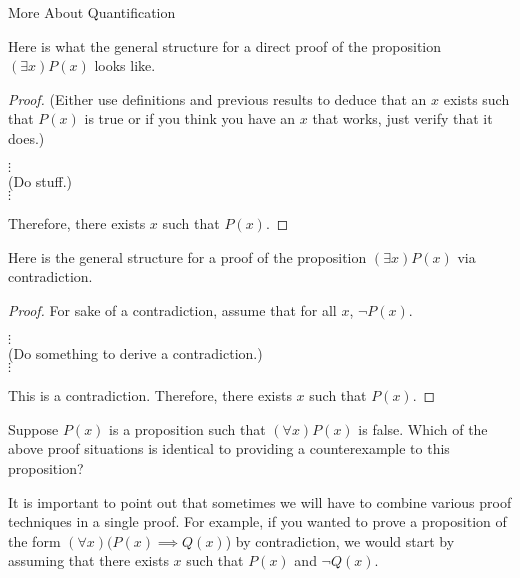 \begin{section}{More About Quantification}
\begin{skeleton}
Here is what the general structure for a direct proof of the proposition $(\exists x)P(x)$ looks like.

\bigskip

\begin{textbox}
\begin{proof}
(Either use definitions and previous results to deduce that an $x$ exists such that $P(x)$ is true or if you think you have an $x$ that works, just verify that it does.)
\begin{center}
$\vdots$\\
(Do stuff.)\\
$\vdots$
\end{center}Therefore, there exists $x$ such that $P(x)$.
\end{proof}
\end{textbox}

\end{skeleton}

\begin{skeleton}
Here is the general structure for a proof of the proposition $(\exists x)P(x)$ via contradiction.

\bigskip

\begin{textbox}
\begin{proof}
For sake of a contradiction, assume that for all $x$, $\neg P(x)$.
\begin{center}
$\vdots$\\
(Do something to derive a contradiction.)\\
$\vdots$
\end{center}
\noindent This is a contradiction.  Therefore, there exists $x$ such that $P(x)$.
\end{proof}
\end{textbox}

\end{skeleton}

\begin{question}
Suppose $P(x)$ is a proposition such that $(\forall x)P(x)$ is false.  Which of the above proof situations is identical to providing a counterexample to this proposition?
\end{question}

\begin{remark}
It is important to point out that sometimes we will have to combine various proof techniques in a single proof.  For example, if you wanted to prove a proposition of the form $(\forall x)(P(x) \implies Q(x)$) by contradiction, we would start by assuming that there exists $x$ such that $P(x)$ and $\neg Q(x)$.
\end{remark}


\end{section}
